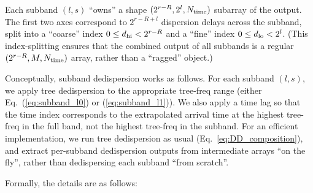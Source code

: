\documentclass{article}
\numberwithin{equation}{section}   %
\begin{document}
Each subband $(l,s)$ ``owns'' a shape $(2^{r-R}, 2^l, N_{\rm time})$ subarray of the output.
The first two axes correspond to $2^{r-R+l}$ dispersion delays across the subband, split into a ``coarse'' index
$0 \le d_{\rm hi} < 2^{r-R}$ and a ``fine'' index  $0 \le d_{\rm lo} < 2^l$.
(This index-splitting ensures that the combined output of all subbands is a regular $(2^{r-R}, M, N_{\rm time})$ array,
rather than a ``ragged'' object.)

Conceptually, subband dedispersion works as follows.
For each subband $(l,s)$, we apply tree dedispersion to the appropriate tree-freq range (either Eq.\ (\ref{eq:subband_l0}) 
or (\ref{eq:subband_l1})). We also apply a time lag so that the time index corresponds to the extrapolated arrival time at 
the highest tree-freq in the full band, not the highest tree-freq in the subband.
For an efficient implementation, we run tree dedispersion as usual (Eq.\ \ref{eq:DD_composition}), and extract per-subband
dedispersion outputs from intermediate arrays ``on the fly'', rather than dedispersing each subband ``from scratch''.

Formally, the details are as follows:
\end{document}
